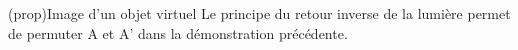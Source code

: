 \documentclass[../../main/main.tex]{subfiles}
\begin{document}
\begin{tcb*}[label=prop, sidebyside, righthand ratio=.4](prop){Image d'un objet
			virtuel}
	Le principe du retour inverse de la lumière permet de permuter A et A'
	dans la démonstration précédente.
	\tcblower
	\begin{center}
		\label{fig:mir_plan-obj_v}
	\end{center}
\end{tcb*}
\end{document}
